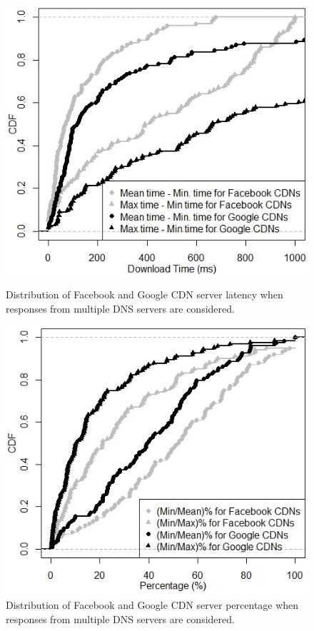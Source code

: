 \documentclass{llncs}
\begin{document}
\begin{figure}
  \includegraphics[width=\linewidth]{figures/download_time_facebook_google_all_dns}
  \caption{Distribution of Facebook and Google CDN server latency when responses from multiple DNS servers are considered.}
  \label{fig:download_time_facebook_google_all_dns}
\endminipage\hfill
{}%
  \includegraphics[width=\linewidth]{figures/download_percentage_facebook_google_all_dns}
  \caption{Distribution of Facebook and Google CDN server percentage when responses from multiple DNS servers are considered.}
  \label{fig:download_percentage_facebook_google_all_dns}
\endminipage
\end{figure}
\end{document}
